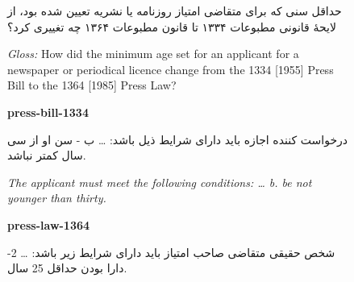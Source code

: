 \begin{figure}[t]
\centering
{}
\begin{tcolorbox}[excard, title={Question\enspace LAW-fa\enspace T3, cross-version}]
\begin{otherlanguage}{persian}
حداقل سنی که برای متقاضی امتیاز روزنامه یا نشریه تعیین شده بود، از لایحهٔ قانونی مطبوعات ۱۳۳۴ تا قانون مطبوعات ۱۳۶۴ چه تغییری کرد؟\par
\end{otherlanguage}
{\footnotesize\color{cAxis}\textit{Gloss:} How did the minimum age set for an applicant for a newspaper or periodical licence change from the 1334 [1955] Press Bill to the 1364 [1985] Press Law?\par}
\end{tcolorbox}
\begin{tcolorbox}[excard, title={Evidence bundle\enspace two documents}]
\begin{tcolorbox}[exdoc]
{\footnotesize\bfseries press-bill-1334}\par
\begin{otherlanguage}{persian}
درخواست کننده اجازه باید دارای شرایط ذیل باشد: \ldots{} ب - سن او از سی سال کمتر نباشد.\par
\end{otherlanguage}
{\footnotesize\color{cAxis}\textit{The applicant must meet the following conditions: \ldots{} b. be not younger than thirty.}\par}
\end{tcolorbox}
\begin{tcolorbox}[exdoc, colframe=cLex, colback=cLex!6]
{\footnotesize\bfseries press-law-1364}\par
\begin{otherlanguage}{persian}
شخص حقیقی متقاضی صاحب امتیاز باید دارای شرایط زیر باشد: \ldots{} 2- دارا بودن حداقل 25 سال.\par

\end{otherlanguage}
\end{tcolorbox}
\end{tcolorbox}
\end{figure}
